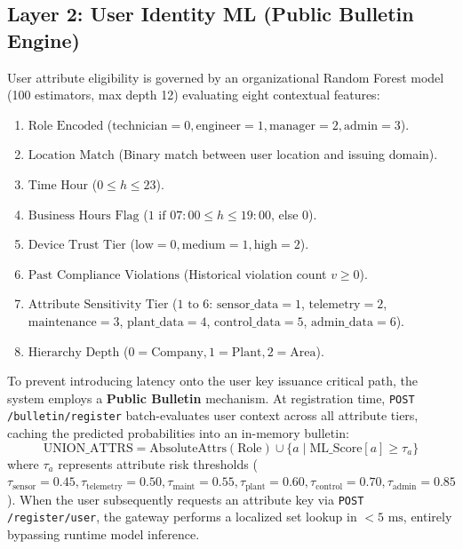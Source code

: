 \documentclass[conference]{IEEEtran}
\begin{document}
\subsection{Layer 2: User Identity ML (Public Bulletin Engine)}
User attribute eligibility is governed by an organizational Random Forest model (100 estimators, max depth 12) evaluating eight contextual features:
\begin{enumerate}
    \item $\text{Role Encoded}$ ($\text{technician}=0, \text{engineer}=1, \text{manager}=2, \text{admin}=3$).
    \item $\text{Location Match}$ (Binary match between user location and issuing domain).
    \item $\text{Time Hour}$ ($0 \le h \le 23$).
    \item $\text{Business Hours Flag}$ ($1 \text{ if } 07:00 \le h \le 19:00$, else $0$).
    \item $\text{Device Trust Tier}$ ($\text{low}=0, \text{medium}=1, \text{high}=2$).
    \item $\text{Past Compliance Violations}$ (Historical violation count $v \ge 0$).
    \item $\text{Attribute Sensitivity Tier}$ ($1 \text{ to } 6$: $\text{sensor\_data}=1$, $\text{telemetry}=2$, $\text{maintenance}=3$, $\text{plant\_data}=4$, $\text{control\_data}=5$, $\text{admin\_data}=6$).
    \item $\text{Hierarchy Depth}$ ($0=\text{Company}, 1=\text{Plant}, 2=\text{Area}$).
\end{enumerate}

To prevent introducing latency onto the user key issuance critical path, the system employs a \textbf{Public Bulletin} mechanism. At registration time, \texttt{POST /bulletin/register} batch-evaluates user context across all attribute tiers, caching the predicted probabilities into an in-memory bulletin:
\begin{equation}
    \text{UNION\_ATTRS} = \text{AbsoluteAttrs}(\text{Role}) \cup \{ a \mid \text{ML\_Score}[a] \ge \tau_a \}
\end{equation}
where $\tau_a$ represents attribute risk thresholds ($\tau_{\text{sensor}}=0.45, \tau_{\text{telemetry}}=0.50, \tau_{\text{maint}}=0.55, \tau_{\text{plant}}=0.60, \tau_{\text{control}}=0.70, \tau_{\text{admin}}=0.85$). When the user subsequently requests an attribute key via \texttt{POST /register/user}, the gateway performs a localized set lookup in $<5\text{ ms}$, entirely bypassing runtime model inference.
\end{document}
